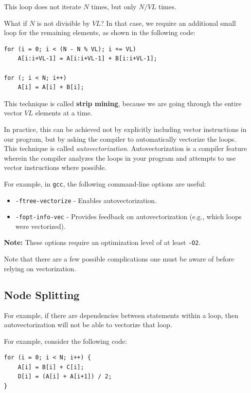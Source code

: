 \documentclass[12pt]{book}
\begin{document}
This loop does not iterate $N$ times, but only $N/VL$ times. 

What if $N$ is not divisible by $VL$? In that case, we require an additional small loop for the remaining elements, as shown in the following code:

\begin{lstlisting}[style=cppstyle]
for (i = 0; i < (N - N % VL); i += VL)
    A[i:i+VL-1] = A[i:i+VL-1] + B[i:i+VL-1];

for (; i < N; i++)
    A[i] = A[i] + B[i];
\end{lstlisting}

This technique is called \textbf{strip mining}, because we are going through the entire vector $VL$ elements at a time.

In practice, this can be achieved not by explicitly including vector instructions in our program, but by asking the compiler to automatically vectorize the loops. This technique is called \textit{autovectorization}. Autovectorization is a compiler feature wherein the compiler analyzes the loops in your program and attempts to use vector instructions where possible.

For example, in \texttt{gcc}, the following command-line options are useful:
\begin{itemize}
    \item \texttt{-ftree-vectorize} - Enables autovectorization.
    \item \texttt{-fopt-info-vec} - Provides feedback on autovectorization (e.g., which loops were vectorized).
\end{itemize}

\noindent \textbf{Note:} These options require an optimization level of at least \texttt{-O2}.

Note that there are a few possible complications one must be aware of before relying on vectorization.

\subsection{Node Splitting}
For example, if there are dependencies between statements within a loop, then autovectorization will not be able to vectorize that loop.

For example, consider the following code:
\begin{lstlisting}[style=cppstyle]
for (i = 0; i < N; i++) {
    A[i] = B[i] + C[i];
    D[i] = (A[i] + A[i+1]) / 2;
}
\end{lstlisting}
\end{document}
